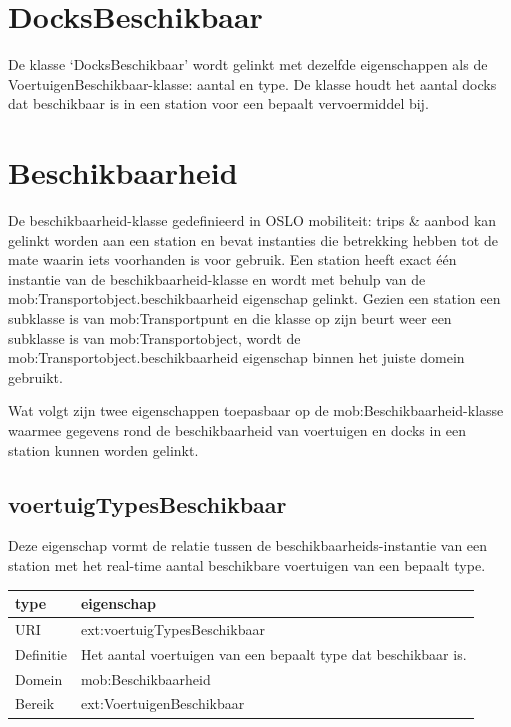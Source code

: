 \section{DocksBeschikbaar}
De klasse `DocksBeschikbaar' wordt gelinkt met dezelfde eigenschappen als de VoertuigenBeschikbaar-klasse: aantal en type. De klasse houdt het aantal \glspl{dock} dat beschikbaar is in een station voor een bepaalt vervoermiddel bij.

\section{Beschikbaarheid}
De beschikbaarheid-klasse gedefinieerd in OSLO mobiliteit: trips \& aanbod kan gelinkt worden aan een station en bevat instanties die betrekking hebben tot de mate waarin iets voorhanden is voor gebruik. Een station heeft exact één instantie van de beschikbaarheid-klasse en wordt met behulp van de mob:Transportobject.beschikbaarheid eigenschap gelinkt. Gezien een station een subklasse is van mob:Transportpunt en die klasse op zijn beurt weer een subklasse is van mob:Transportobject, wordt de mob:Transportobject.beschikbaarheid eigenschap binnen het juiste domein gebruikt.

Wat volgt zijn twee eigenschappen toepasbaar op de mob:Beschikbaarheid-klasse waarmee gegevens rond de beschikbaarheid van voertuigen en docks in een station kunnen worden gelinkt.

\subsection{voertuigTypesBeschikbaar}
Deze eigenschap vormt de relatie tussen de beschikbaarheids-instantie van een station met het real-time aantal beschikbare voertuigen van een bepaalt type.

\begin{table}[h]
\begin{tabular}{|l|l|}
\hline
\textbf{type}     & \textbf{eigenschap} \\ \hline
URI               & ext:voertuigTypesBeschikbaar \\ \hline
Definitie         & Het aantal voertuigen van een bepaalt type dat beschikbaar is.                                   \\ \hline
Domein & mob:Beschikbaarheid \\ \hline
Bereik & ext:VoertuigenBeschikbaar \\ \hline
\end{tabular}
\end{table}

